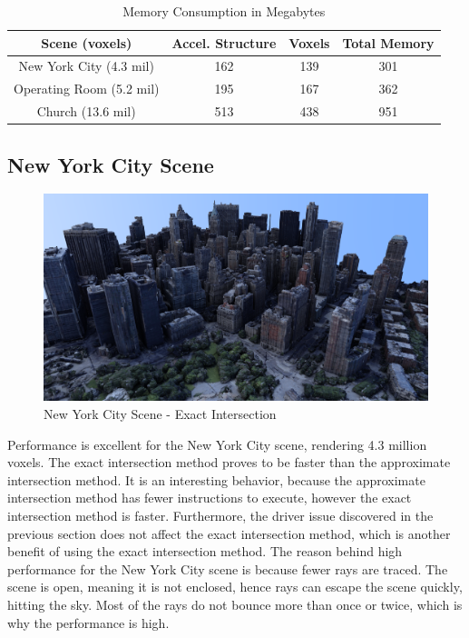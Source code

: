 \documentclass[12pt]{article}
\begin{document}

\begin{table}[H]
    \centering
    \caption{Memory Consumption in Megabytes}
    \vspace{0.5cm}
    \label{tab:Memory-Consumption}
    \begin{tabular}{c||c|c|c|}
        Scene (voxels)           & Accel. Structure & Voxels & Total Memory \\ \toprule
        New York City (4.3 mil)  & 162              & 139    & 301          \\
        Operating Room (5.2 mil) & 195              & 167    & 362          \\
        Church (13.6 mil)        & 513              & 438    & 951          \\
    \end{tabular}
\end{table}

\subsection{New York City Scene}

\begin{figure}[H]
    \begin{center}
        \includegraphics[scale=0.25]{NewYorkCity}
    \end{center}
    \caption{New York City Scene - Exact Intersection}
    \label{fig:NewYorkCity}
\end{figure}

Performance is excellent for the New York City scene, rendering 4.3 million voxels.
The exact intersection method proves to be faster than the approximate intersection method.
It is an interesting behavior, because the approximate intersection method has fewer
instructions to execute, however the exact intersection method is faster.
Furthermore, the driver issue discovered in the previous section does not affect the exact intersection method,
which is another benefit of using the exact intersection method.
The reason behind high performance for the New York City scene is because fewer rays are traced.
The scene is open, meaning it is not enclosed, hence rays can escape the scene quickly,
hitting the sky. Most of the rays do not bounce more than once or twice, which is why the performance is high.
\end{document}
